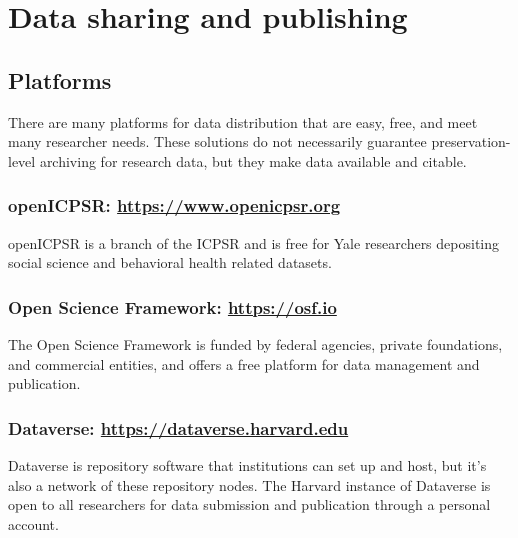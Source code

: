 \section{Data sharing and publishing}\label{data-sharing-and-publishing}

\subsection{Platforms}\label{platforms}

There are many platforms for data distribution that are easy, free, and
meet many researcher needs. These solutions do not necessarily guarantee
preservation-level archiving for research data, but they make data
available and citable.

\subsubsection{\texorpdfstring{openICPSR:
\href{https://www.openicpsr.org/openicpsr/}{https://www.openicpsr.org}}{openICPSR: https://www.openicpsr.org}}\label{openicpsr-httpswww.openicpsr.org}

openICPSR is a branch of the ICPSR and is free for Yale researchers
depositing social science and behavioral health related datasets.

\subsubsection{\texorpdfstring{Open Science Framework:
\href{https://osf.io/}{https://osf.io}}{Open Science Framework: https://osf.io}}\label{open-science-framework-httpsosf.io}

The Open Science Framework is funded by federal agencies, private
foundations, and commercial entities, and offers a free platform for
data management and publication.

\subsubsection{\texorpdfstring{Dataverse:
\href{https://dataverse.harvard.edu/}{https://dataverse.harvard.edu}}{Dataverse: https://dataverse.harvard.edu}}\label{dataverse-httpsdataverse.harvard.edu}

Dataverse is repository software that institutions can set up and host,
but it's also a network of these repository nodes. The Harvard instance
of Dataverse is open to all researchers for data submission and
publication through a personal account.

